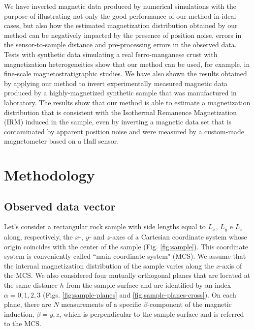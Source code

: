 \documentclass[galley,gc]{agutex}
\begin{document}
\begin{article}
We have inverted magnetic data produced by
numerical simulations with the purpose of illustrating not only the 
good performance of our method in ideal cases, but also how
the estimated magnetization distribution obtained by our
method can be negatively impacted by the presence of position 
noise, errors in the sensor-to-sample distance and 
pre-processing errors in the observed data.
Tests with synthetic data simulating a real ferro-manganese
crust with magnetization heterogeneities show that our method 
can be used, for example, in fine-scale magnetostratigraphic 
studies.
We have also shown the results obtained by applying our method
to invert experimentally measured magnetic data produced by
a highly-magnetized synthetic sample that was manufactured in 
laboratory.
The results show that our method is able to estimate a magnetization
distribution that is consistent with the Isothermal Remanence 
Magnetization (IRM) induced in the
sample, even by inverting a magnetic data set that is contaminated 
by apparent position noise and were measured by a
custom-made magnetometer based on a Hall sensor.

\section{Methodology}
\label{sec:Methodology}

\subsection{Observed data vector}
\label{subsec:Observed data vector}


Let's consider a rectangular rock sample with side lengths equal 
to $L_{x}$, $L_{y}$ e $L_{z}$ along, respectively, the $x$-, $y$- and 
$z$-axes of a Cartesian coordinate system 
whose origin coincides with the center of the sample 
(Fig. \ref{fig:sample}). 
This coordinate system is conveniently called 
``main coordinate system" (MCS).
We assume that the internal magnetization distribution of the sample
varies along the $x$-axis of the MCS.
We also considered four mutually orthogonal planes that are located 
at the same distance $h$ from the sample surface and are identified 
by an index $\alpha = 0, 1, 2, 3$
(Figs. \ref{fig:sample-planes} and \ref{fig:sample-planes-cross}).
On each plane, there are $N$ measurements of a specific 
$\beta$-component of the magnetic induction, $\beta = y, z$, 
which is perpendicular to the sample surface and is referred
to the MCS.


\end{article}
\end{document}
